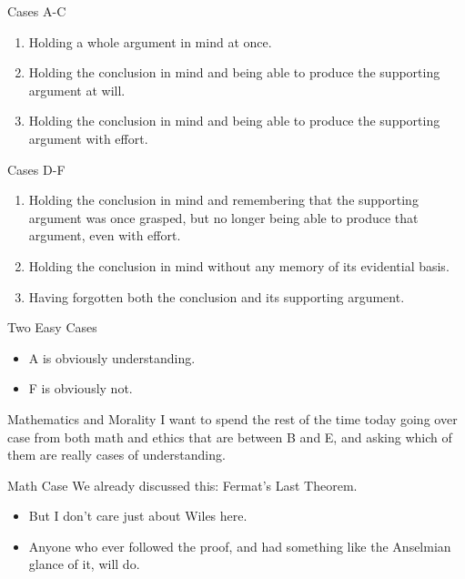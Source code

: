 \documentclass[
  17pt,
  letterpaper,
  ignorenonframetext,
  aspectratio=169,
  handout]{beamer}
\providecommand{\tightlist}{%
  \setlength{\itemsep}{0pt}\setlength{\parskip}{0pt}}\usepackage{longtable,booktabs,array}
\begin{document}
\begin{frame}{Cases A-C}
\protect\hypertarget{cases-a-c}{}
\begin{enumerate}[<+->]
[A.]
\tightlist
\item
  Holding a whole argument in mind at once.
\item
  Holding the conclusion in mind and being able to produce the
  supporting argument at will.
\item
  Holding the conclusion in mind and being able to produce the
  supporting argument with effort.
\end{enumerate}
\end{frame}

\begin{frame}{Cases D-F}
\protect\hypertarget{cases-d-f}{}
\begin{enumerate}[<+->]
[A.]
\setcounter{enumi}{3}
\tightlist
\item
  Holding the conclusion in mind and remembering that the supporting
  argument was once grasped, but no longer being able to produce that
  argument, even with effort.
\item
  Holding the conclusion in mind without any memory of its evidential
  basis.
\item
  Having forgotten both the conclusion and its supporting argument.
\end{enumerate}
\end{frame}

\begin{frame}{Two Easy Cases}
\protect\hypertarget{two-easy-cases}{}
\begin{itemize}[<+->]
\tightlist
\item
  A is obviously understanding.
\item
  F is obviously not.
\end{itemize}
\end{frame}

\begin{frame}{Mathematics and Morality}
\protect\hypertarget{mathematics-and-morality-4}{}
I want to spend the rest of the time today going over case from both
math and ethics that are between B and E, and asking which of them are
really cases of understanding.
\end{frame}

\begin{frame}{Math Case}
\protect\hypertarget{math-case}{}
We already discussed this: Fermat's Last Theorem.

\begin{itemize}[<+->]
\tightlist
\item
  But I don't care just about Wiles here.
\item
  Anyone who ever followed the proof, and had something like the
  Anselmian glance of it, will do.
\end{itemize}
\end{frame}
\end{document}
